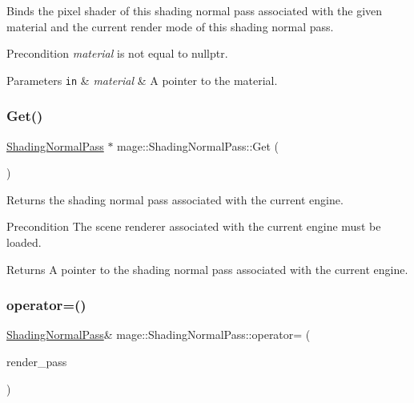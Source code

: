 Binds the pixel shader of this shading normal pass associated with the given material and the current render mode of this shading normal pass.

\begin{DoxyPrecond}{Precondition}
{\itshape material} is not equal to {\ttfamily nullptr}. 
\end{DoxyPrecond}

\begin{DoxyParams}[1]{Parameters}
\mbox{\tt in}  & {\em material} & A pointer to the material. \\
\hline
\end{DoxyParams}
\hypertarget{classmage_1_1_shading_normal_pass_a27351f21b0e5d780b9c68e01f1428ace}{}\label{classmage_1_1_shading_normal_pass_a27351f21b0e5d780b9c68e01f1428ace} 
\subsubsection{\texorpdfstring{Get()}{Get()}}
{\footnotesize\ttfamily \hyperlink{classmage_1_1_shading_normal_pass}{Shading\+Normal\+Pass} $\ast$ mage\+::\+Shading\+Normal\+Pass\+::\+Get (\begin{DoxyParamCaption}{ }\end{DoxyParamCaption})\hspace{0.3cm}{\ttfamily [static]}}

Returns the shading normal pass associated with the current engine.

\begin{DoxyPrecond}{Precondition}
The scene renderer associated with the current engine must be loaded. 
\end{DoxyPrecond}
\begin{DoxyReturn}{Returns}
A pointer to the shading normal pass associated with the current engine. 
\end{DoxyReturn}
\hypertarget{classmage_1_1_shading_normal_pass_afef400a6e3b00a43f6b6d3a3f34d43b7}{}\label{classmage_1_1_shading_normal_pass_afef400a6e3b00a43f6b6d3a3f34d43b7} 
\subsubsection{\texorpdfstring{operator=()}{operator=()}\hspace{0.1cm}{\footnotesize\ttfamily [1/2]}}
{\footnotesize\ttfamily \hyperlink{classmage_1_1_shading_normal_pass}{Shading\+Normal\+Pass}\& mage\+::\+Shading\+Normal\+Pass\+::operator= (\begin{DoxyParamCaption}\item[{const \hyperlink{classmage_1_1_shading_normal_pass}{Shading\+Normal\+Pass} \&}]{render\+\_\+pass }\end{DoxyParamCaption})\hspace{0.3cm}{\ttfamily [delete]}}

